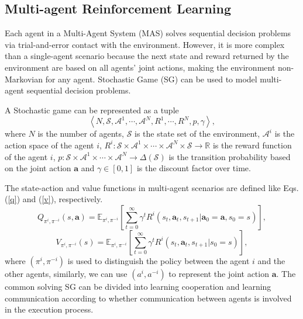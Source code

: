 \documentclass[acmsmall]{acmart}
\begin{document}
\subsection{Multi-agent Reinforcement Learning}
Each agent in a Multi-Agent System (MAS) solves sequential decision problems via trial-and-error contact with the environment. However, it is more complex than a single-agent scenario because the next state and reward returned by the environment are based on all agents' joint actions, making the environment non-Markovian for any agent. Stochastic Game (SG) can be used to model multi-agent sequential decision problems.
\begin{definition}[SG]
    A Stochastic game can be represented as a tuple $$\left<N, \mathcal{S}, \mathcal A^1, \cdots, \mathcal A^N, R^1, \cdots, R^N, p,\gamma \right>,$$ where $N$ is the number of agents, $\mathcal S$ is the state set of the environment, $\mathcal A^i$ is the action space of the agent $i$, $R^i: \mathcal S \times \mathcal A^1 \times \cdots \times \mathcal A^N \times \mathcal S \rightarrow \mathbb R $ is the reward function of the agent $i$, $p:\mathcal S \times \mathcal A^1 \times \cdots \times \mathcal A^N  \rightarrow \Delta\left(\mathcal S\right)$ is the transition probability based on the joint action $\bm a$ and $\gamma \in \left[0,1\right]$ is the discount factor over time.
\end{definition}
The state-action and value functions in multi-agent scenarios are defined like Eqs. (\ref{q}) and (\ref{v}), respectively. 
\begin{equation} \label{mq}
    Q_{\pi^i,\pi^{-i}}\left(s, \bm a\right) = \mathbb E_{\pi^i,\pi^{-i}}\left[\sum_{t=0}^\infty \gamma^tR^i\left(s_t,\bm a_t,s_{t+1}|\bm a_0 = \bm a, s_0 = s\right)\right],
\end{equation}
\begin{equation} \label{mv}
    V_{\pi^i,\pi^{-i}}\left(s\right) = \mathbb E_{\pi^i,\pi^{-i}}\left[\sum_{t=0}^\infty \gamma^tR^i\left(s_t,\bm a_t,s_{t+1}|s_0 = s\right)\right],
\end{equation}
where $\left(\pi^i,\pi^{-i}\right)$ is used to distinguish the policy between the agent $i$ and the other agents, similarly, we can use $\left(a^i, a^{-i}\right)$ to represent the joint action $\bm a$. The common solving SG can be divided into learning cooperation and learning communication according to whether communication between agents is involved in the execution process.
\end{document}
